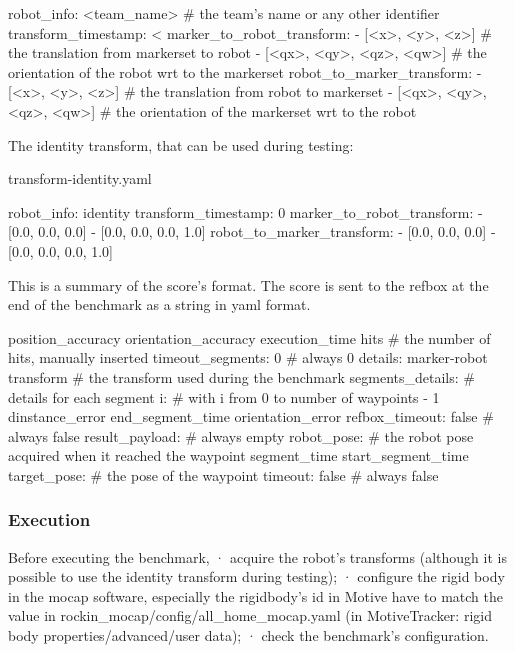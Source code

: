 \documentclass[a4paper]{article}
\begin{document}
robot_info: <team_name> # the team's name or any other identifier
transform_timestamp: <%
marker_to_robot_transform:
- [<x>, <y>, <z>] # the translation from markerset to robot
- [<qx>, <qy>, <qz>, <qw>] # the orientation of the robot wrt to the markerset
robot_to_marker_transform:
- [<x>, <y>, <z>] # the translation from robot to markerset
- [<qx>, <qy>, <qz>, <qw>] # the orientation of the markerset wrt to the robot

The identity transform, that can be used during testing:

transform-identity.yaml

robot_info: identity
transform_timestamp: 0
marker_to_robot_transform:
- [0.0, 0.0, 0.0]
- [0.0, 0.0, 0.0, 1.0]
robot_to_marker_transform:
- [0.0, 0.0, 0.0]
- [0.0, 0.0, 0.0, 1.0]



This is a summary of the score's format.
The score is sent to the refbox at the end of the benchmark as a string in yaml format.

position_accuracy
orientation_accuracy
execution_time
hits # the number of hits, manually inserted
timeout_segments: 0 # always 0
details:
  marker-robot transform # the transform used during the benchmark
segments_details: # details for each segment
  i: # with i from 0 to number of waypoints - 1
    dinstance_error
    end_segment_time
    orientation_error
    refbox_timeout: false # always false
    result_payload: {} # always empty
    robot_pose: # the robot pose acquired when it reached the waypoint
    segment_time
    start_segment_time
    target_pose: # the pose of the waypoint
    timeout: false # always false


\subsubsection{Execution}

Before executing the benchmark,
· acquire the robot's transforms (although it is possible to use the identity transform during testing);
· configure the rigid body in the mocap software, especially the rigidbody's id in Motive have to match the value in rockin_mocap/config/all_home_mocap.yaml (in MotiveTracker: rigid body properties/advanced/user data);
· check the benchmark's configuration.

\end{document}
